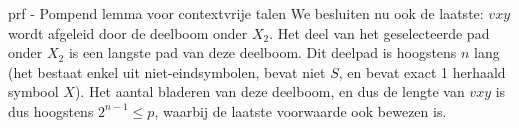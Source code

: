 \begin{prf}{prf - Pompend lemma voor contextvrije talen}
    We besluiten nu ook de laatste: $vxy$ wordt afgeleid door de deelboom onder $X_2$. Het deel van het geselecteerde pad onder $X_2$ is een langste pad van deze deelboom. Dit deelpad is hoogstens $n$ lang (het bestaat enkel uit niet-eindsymbolen, bevat niet $S$, en bevat exact 1 herhaald symbool $X$). Het aantal bladeren van deze deelboom, en dus de lengte van $vxy$ is dus hoogstens $2^{n-1} \leq p$, waarbij de laatste voorwaarde ook bewezen is.

\end{prf}

